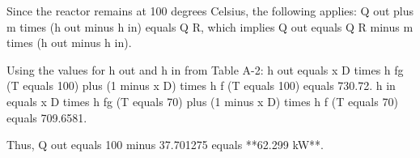 Since the reactor remains at 100 degrees Celsius, the following applies:  
Q out plus m times (h out minus h in) equals Q R, which implies Q out equals Q R minus m times (h out minus h in).  

Using the values for h out and h in from Table A-2:  
h out equals x D times h fg (T equals 100) plus (1 minus x D) times h f (T equals 100) equals 730.72.  
h in equals x D times h fg (T equals 70) plus (1 minus x D) times h f (T equals 70) equals 709.6581.  

Thus, Q out equals 100 minus 37.701275 equals **62.299 kW**.